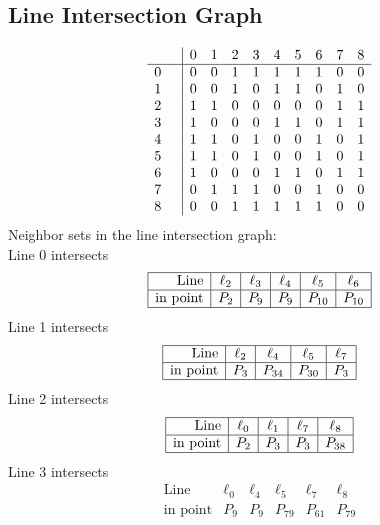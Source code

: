 \documentclass{article}
\begin{document}
{\subsection*{Line Intersection Graph}
{\arraycolsep=1pt
$$
\begin{array}{rr|*{9}r}
 &  & 0 & 1 & 2 & 3 & 4 & 5 & 6 & 7 & 8\\
\hline
0 &  & 0 & 0 & 1 & 1 & 1 & 1 & 1 & 0 & 0\\
1 &  & 0 & 0 & 1 & 0 & 1 & 1 & 0 & 1 & 0\\
2 &  & 1 & 1 & 0 & 0 & 0 & 0 & 0 & 1 & 1\\
3 &  & 1 & 0 & 0 & 0 & 1 & 1 & 0 & 1 & 1\\
4 &  & 1 & 1 & 0 & 1 & 0 & 0 & 1 & 0 & 1\\
5 &  & 1 & 1 & 0 & 1 & 0 & 0 & 1 & 0 & 1\\
6 &  & 1 & 0 & 0 & 0 & 1 & 1 & 0 & 1 & 1\\
7 &  & 0 & 1 & 1 & 1 & 0 & 0 & 1 & 0 & 0\\
8 &  & 0 & 0 & 1 & 1 & 1 & 1 & 1 & 0 & 0\\
\end{array}
$$
}%
Neighbor sets in the line intersection graph:\\
Line 0 intersects 
$$
\begin{array}{|r*{5}{|c}|}
\hline
\mbox{Line}  & \ell_{2} & \ell_{3} & \ell_{4} & \ell_{5} & \ell_{6}\\
\hline
\mbox{in point}  & P_{2} & P_{9} & P_{9} & P_{10} & P_{10}\\
\hline
\end{array}
$$
Line 1 intersects 
$$
\begin{array}{|r*{4}{|c}|}
\hline
\mbox{Line}  & \ell_{2} & \ell_{4} & \ell_{5} & \ell_{7}\\
\hline
\mbox{in point}  & P_{3} & P_{34} & P_{30} & P_{3}\\
\hline
\end{array}
$$
Line 2 intersects 
$$
\begin{array}{|r*{4}{|c}|}
\hline
\mbox{Line}  & \ell_{0} & \ell_{1} & \ell_{7} & \ell_{8}\\
\hline
\mbox{in point}  & P_{2} & P_{3} & P_{3} & P_{38}\\
\hline
\end{array}
$$
Line 3 intersects 
$$
\begin{array}{|r*{5}{|c}|}
\hline
\mbox{Line}  & \ell_{0} & \ell_{4} & \ell_{5} & \ell_{7} & \ell_{8}\\
\hline
\mbox{in point}  & P_{9} & P_{9} & P_{79} & P_{61} & P_{79}\\

\end{array}$$}
\end{document}
